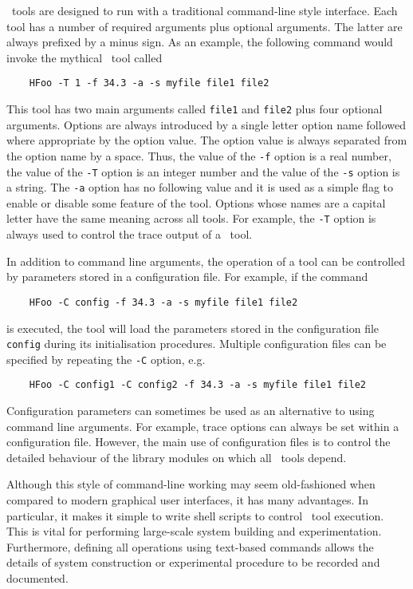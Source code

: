 
\HTK\ tools are designed to run with a traditional command-line style interface.
Each tool
has a number of required arguments plus optional arguments.
The latter are always prefixed by a minus sign.  As an example,
the following command would invoke the mythical \HTK\ tool called
\begin{verbatim}
    HFoo -T 1 -f 34.3 -a -s myfile file1 file2
\end{verbatim}
This tool has two main arguments called \texttt{file1} and
\texttt{file2} plus four optional arguments.  Options
are always introduced by a single letter option name followed
where appropriate by the option value.  The option value
is always separated from the option name by a space. Thus, the value of the
\texttt{-f} option is a real number, the value of the
\texttt{-T} option is an integer number and the value of the
\texttt{-s} option is a string.  The \texttt{-a} option has no following
value and it is used as a simple flag to enable or disable some
feature of the tool.  Options whose names are a capital letter
have the same meaning across all tools.  For example, the \texttt{-T}
option is always used to control the trace output of a \HTK\ tool.

In addition to command line arguments, the operation of a tool
can be controlled by parameters stored 
in a configuration file.
For example, if the command 
\begin{verbatim}
    HFoo -C config -f 34.3 -a -s myfile file1 file2
\end{verbatim}
is executed, the tool  will load the 
parameters stored in the configuration
file \texttt{config} during its initialisation procedures.  Multiple
configuration files can be specified by repeating the \verb|-C|
option, e.g.\ 
\begin{verbatim}
    HFoo -C config1 -C config2 -f 34.3 -a -s myfile file1 file2
\end{verbatim}
Configuration parameters can sometimes be used as an
alternative to using command line arguments.  For example, trace
options can always be set within a configuration file.  However, the
main use of configuration files is to control the detailed behaviour
of the library modules on which all \HTK\ tools depend.

Although this style of command-line 
working may seem old-fashioned when compared to modern
graphical user interfaces, it has many advantages.  In particular,
it makes it simple to write shell scripts to control \HTK\ tool execution.  This
is vital for performing large-scale system building and experimentation.
Furthermore, defining all operations using text-based commands allows
the details of system construction or experimental procedure to
be recorded and documented.

